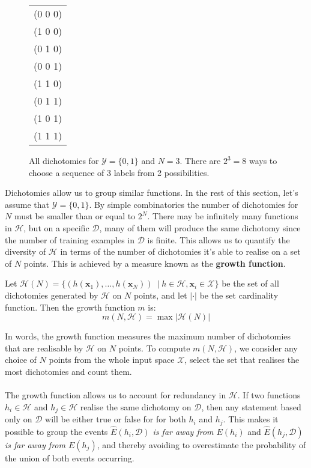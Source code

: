 \begin{figure}[h]
	\begin{center}
			\begin{tabular}{c}
		(0 0 0) \\
		(1 0 0) \\
		(0 1 0) \\
		(0 0 1) \\
		(1 1 0) \\
		(0 1 1) \\
		(1 0 1) \\
		(1 1 1) \\
	\end{tabular}
	\end{center}
	\caption{All dichotomies for $\mathcal{Y} = \{0, 1\}$ and $N = 3$. There are $2^3 = 8$ ways to choose a sequence of 3 labels from 2 possibilities.}
	\label{dichotomies}
\end{figure}

Dichotomies allow us to group similar functions. In the rest of this section, let's assume that $\mathcal{Y} = \{0, 1\}$. By simple combinatorics the number of dichotomies for $N$ must be smaller than or equal to $2^N$. There may be infinitely many functions in $\mathcal{H}$, but on a specific $\mathcal{D}$, many of them will produce the same dichotomy since the number of training examples in $\mathcal{D}$ is finite.
This allows us to quantify the diversity of $\mathcal{H}$ in terms of the number of dichotomies it's able to realise on a set of $N$ points. This is achieved by a measure known as the \textbf{growth function}.
\begin{definition}
	\label{growth_function}
	Let $\mathcal{H}(N) = \{(h(\mathbf{x}_1), \dots, h(\mathbf{x}_N))\ \mid h \in \mathcal{H}, \mathbf{x}_i \in \mathcal{X}\}$ be the set of all dichotomies generated by $\mathcal{H}$ on $N$ points, and let $|\cdot|$ be the set cardinality function. Then the growth function $m$ is:
	$$
		m(N, \mathcal{H}) = \max |\mathcal{H}(N)|
	$$
\end{definition}
In words, the growth function measures the maximum number of dichotomies that are realisable by $\mathcal{H}$ on $N$ points. To compute $m(N, \mathcal{H})$, we consider any choice of $N$ points from the whole input space $\mathcal{X}$, select the set that realises the most dichotomies and count them.
\\\\
The growth function allows us to account for redundancy in $\mathcal{H}$. If two functions $h_i \in \mathcal{H}$ and $h_j \in \mathcal{H}$ realise the same dichotomy on $\mathcal{D}$, then any statement based only on $\mathcal{D}$ will be either true or false for for both $h_i$ and $h_j$. This makes it possible to group the events \textit{$\hat{E}(h_i, \mathcal{D})$ is far away from $E(h_i)$} and \textit{$\hat{E}(h_j, \mathcal{D})$ is far away from $E(h_j)$}, and thereby avoiding to overestimate the probability of the union of both events occurring.

